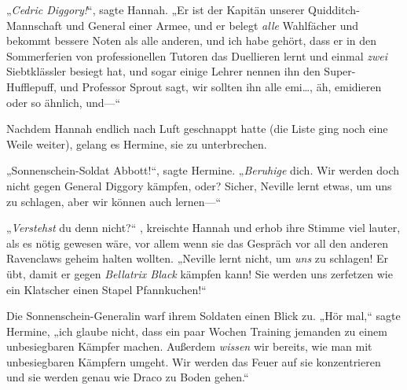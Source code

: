 „\emph{Cedric Diggory!}“, sagte Hannah. „Er ist der Kapitän unserer Quidditch-Mannschaft und General einer Armee, und er belegt \emph{alle} Wahlfächer und bekommt bessere Noten als alle anderen, und ich habe gehört, dass er in den Sommerferien von professionellen Tutoren das Duellieren lernt und einmal \emph{zwei} Siebtklässler besiegt hat, und sogar einige Lehrer nennen ihn den Super-Hufflepuff, und Professor Sprout sagt, wir sollten ihn alle emi…, äh, emidieren oder so ähnlich, und—“

Nachdem Hannah endlich nach Luft geschnappt hatte (die Liste ging noch eine Weile weiter), gelang es Hermine, sie zu unterbrechen.

„Sonnenschein-Soldat Abbott!“, sagte Hermine. „\emph{Beruhige} dich. Wir werden doch nicht gegen General Diggory kämpfen, oder? Sicher, Neville lernt etwas, um uns zu schlagen, aber wir können auch lernen—“

„\emph{Verstehst} du denn nicht?“ , kreischte Hannah und erhob ihre Stimme viel lauter, als es nötig gewesen wäre, vor allem wenn sie das Gespräch vor all den anderen Ravenclaws geheim halten wollten. „Neville lernt nicht, um \emph{uns} zu schlagen! Er übt, damit er gegen \emph{Bellatrix Black} kämpfen kann! Sie werden uns zerfetzen wie ein Klatscher einen Stapel Pfannkuchen!“

Die Sonnenschein-Generalin warf ihrem Soldaten einen Blick zu. „Hör mal,“ sagte Hermine, „ich glaube nicht, dass ein paar Wochen Training jemanden zu einem unbesiegbaren Kämpfer machen. Außerdem \emph{wissen} wir bereits, wie man mit unbesiegbaren Kämpfern umgeht. Wir werden das Feuer auf sie konzentrieren und sie werden genau wie Draco zu Boden gehen.“

